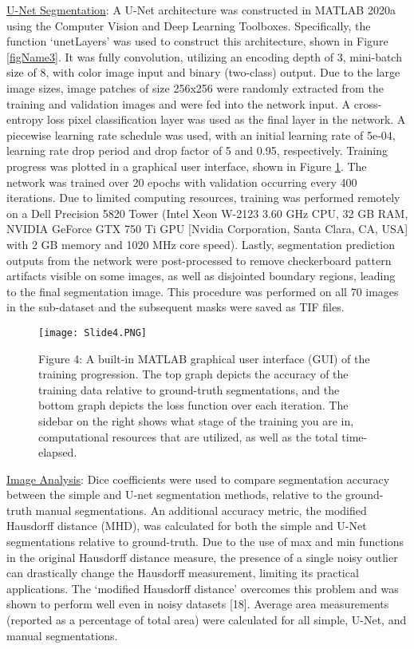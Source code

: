 \documentclass[conference]{IEEEtran}
\begin{document}
\ul{U-Net Segmentation}: A U-Net architecture was constructed in MATLAB 2020a using the Computer Vision and Deep Learning Toolboxes. Specifically, the function ‘unetLayers’ was used to construct this architecture, shown in Figure \ref{figName3}. It was fully convolution, utilizing an encoding depth of 3, mini-batch size of 8, with color image input and binary (two-class) output. Due to the large image sizes, image patches of size 256x256 were randomly extracted from the training and validation images and were fed into the network input. A cross-entropy loss pixel classification layer was used as the final layer in the network. A piecewise learning rate schedule was used, with an initial learning rate of 5e-04, learning rate drop period and drop factor of 5 and 0.95, respectively. Training progress was plotted in a graphical user interface, shown in Figure \ref{figName4}.  The network was trained over 20 epochs with validation occurring every 400 iterations. Due to limited computing resources, training was performed remotely on a Dell Precision 5820 Tower (Intel Xeon W-2123 3.60 GHz CPU, 32 GB RAM, NVIDIA GeForce GTX 750 Ti GPU [Nvidia Corporation, Santa Clara, CA, USA] with 2 GB memory and 1020 MHz core speed). Lastly, segmentation prediction outputs from the network were post-processed to remove checkerboard pattern artifacts visible on some images, as well as disjointed boundary regions, leading to the final segmentation image. This procedure was performed on all 70 images in the sub-dataset and the subsequent masks were saved as TIF files. 

\begin{figure}[h]
\centering
\texttt{[image: Slide4.PNG]}
\caption{Figure 4: A built-in MATLAB graphical user interface (GUI) of the training progression. The top graph depicts the accuracy of the training data relative to ground-truth segmentations, and the bottom graph depicts the loss function over each iteration. The sidebar on the right shows what stage of the training you are in, computational resources that are utilized, as well as the total time-elapsed.}
\label{figName4}
\end{figure}

\ul{Image Analysis}: Dice coefficients were used to compare segmentation accuracy between the simple and U-net segmentation methods, relative to the ground-truth manual segmentations. An additional accuracy metric, the modified Hausdorff distance (MHD), was calculated for both the simple and U-Net segmentations relative to ground-truth. Due to the use of max and min functions in the original Hausdorff distance measure, the presence of a single noisy outlier can drastically change the Hausdorff measurement, limiting its practical applications. The ‘modified Hausdorff distance’ overcomes this problem and was shown to perform well even in noisy datasets [18]. Average area measurements (reported as a percentage of total area) were calculated for all simple, U-Net, and manual segmentations. 
\end{document}
